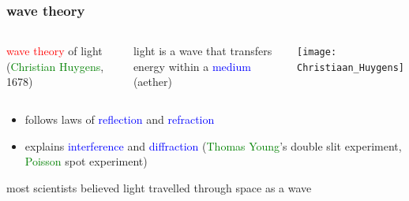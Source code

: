 \documentclass[12pt,xcolor=svgnames,handout]{beamer}
\newcommand{\tightframetitle}[1]{ %
\frametitle{#1}\vspace{-.6\baselineskip}}
\begin{document}
\begin{frame}
\tightframetitle{wave theory}

\begin{columns}
\begin{block}{}
\textcolor{red}{wave theory} of light (\textcolor{Green}{Christian Huygens}, 1678)
\end{block}

\begin{block}{}
light is a wave that transfers energy within a \textcolor{blue}{medium} (aether)
\end{block}

\begin{block}{}
\centering
\texttt{[image: Christiaan\_Huygens]}
\end{block}
\end{columns}

\pause

\begin{block}{}
\begin{itemize}
\item follows laws of \textcolor{blue}{reflection} and \textcolor{blue}{refraction}

\item explains \textcolor{blue}{interference} and \textcolor{blue}{diffraction} (\textcolor{Green}{Thomas Young}'s double slit experiment, \textcolor{Green}{Poisson} spot experiment)
\end{itemize}
\end{block}

\pause

\begin{block}{}
most scientists believed light travelled through space as a wave
\end{block}

\end{frame}
\end{document}
